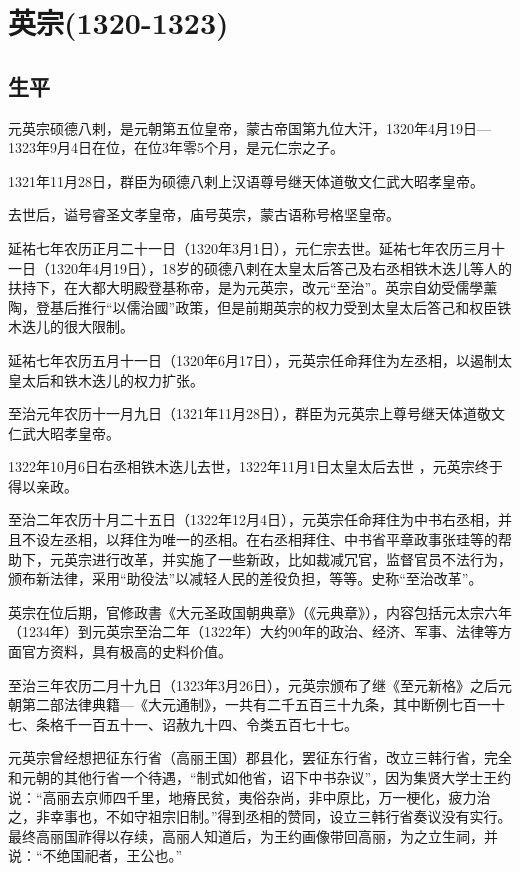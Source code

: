 
\section{英宗\tiny(1320-1323)}

\subsection{生平}

元英宗硕德八剌，是元朝第五位皇帝，蒙古帝国第九位大汗，1320年4月19日—1323年9月4日在位，在位3年零5个月，是元仁宗之子。

1321年11月28日，群臣为硕德八剌上汉语尊号继天体道敬文仁武大昭孝皇帝。

去世后，谥号睿圣文孝皇帝，庙号英宗，蒙古语称号格坚皇帝。

延祐七年农历正月二十一日（1320年3月1日），元仁宗去世。延祐七年农历三月十一日（1320年4月19日），18岁的硕德八剌在太皇太后答己及右丞相铁木迭儿等人的扶持下，在大都大明殿登基称帝，是为元英宗，改元“至治”。英宗自幼受儒學薰陶，登基后推行“以儒治國”政策，但是前期英宗的权力受到太皇太后答己和权臣铁木迭儿的很大限制。

延祐七年农历五月十一日（1320年6月17日），元英宗任命拜住为左丞相，以遏制太皇太后和铁木迭儿的权力扩张。

至治元年农历十一月九日（1321年11月28日），群臣为元英宗上尊号继天体道敬文仁武大昭孝皇帝。

1322年10月6日右丞相铁木迭儿去世，1322年11月1日太皇太后去世 ，元英宗终于得以亲政。

至治二年农历十月二十五日（1322年12月4日），元英宗任命拜住为中书右丞相，并且不设左丞相，以拜住为唯一的丞相。在右丞相拜住、中书省平章政事张珪等的帮助下，元英宗进行改革，并实施了一些新政，比如裁减冗官，监督官员不法行为，颁布新法律，采用“助役法”以减轻人民的差役负担，等等。史称“至治改革”。

英宗在位后期，官修政書《大元圣政国朝典章》（《元典章》），内容包括元太宗六年（1234年）到元英宗至治二年（1322年）大约90年的政治、经济、军事、法律等方面官方资料，具有极高的史料价值。

至治三年农历二月十九日（1323年3月26日），元英宗颁布了继《至元新格》之后元朝第二部法律典籍—《大元通制》，一共有二千五百三十九条，其中断例七百一十七、条格千一百五十一、诏赦九十四、令类五百七十七。

元英宗曾经想把征东行省（高丽王国）郡县化，罢征东行省，改立三韩行省，完全和元朝的其他行省一个待遇，“制式如他省，诏下中书杂议”，因为集贤大学士王约说：“高丽去京师四千里，地瘠民贫，夷俗杂尚，非中原比，万一梗化，疲力治之，非幸事也，不如守祖宗旧制。”得到丞相的赞同，设立三韩行省奏议没有实行。最终高丽国祚得以存续，高丽人知道后，为王约画像带回高丽，为之立生祠，并说：“不绝国祀者，王公也。”

